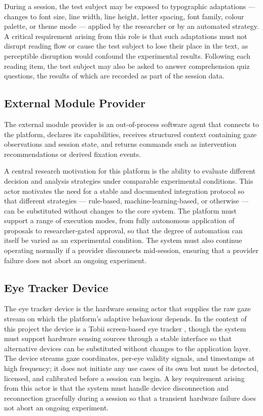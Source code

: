 During a session, the test subject may be exposed to typographic adaptations --- changes to font size, line width, line height, letter spacing, font family, colour palette, or theme mode --- applied by the researcher or by an automated strategy.
A critical requirement arising from this role is that such adaptations must not disrupt reading flow or cause the test subject to lose their place in the text, as perceptible disruption would confound the experimental results.
Following each reading item, the test subject may also be asked to answer comprehension quiz questions, the results of which are recorded as part of the session data.

\subsection{External Module Provider}
\label{sec:stakeholder-provider}

The external module provider is an out-of-process software agent that connects to the platform, declares its capabilities, receives structured context containing gaze observations and session state, and returns commands such as intervention recommendations or derived fixation events.

A central research motivation for this platform is the ability to evaluate different decision and analysis strategies under comparable experimental conditions.
This actor motivates the need for a stable and documented integration protocol so that different strategies --- rule-based, machine-learning-based, or otherwise --- can be substituted without changes to the core system.
The platform must support a range of execution modes, from fully autonomous application of proposals to researcher-gated approval, so that the degree of automation can itself be varied as an experimental condition.
The system must also continue operating normally if a provider disconnects mid-session, ensuring that a provider failure does not abort an ongoing experiment.

\subsection{Eye Tracker Device}
\label{sec:stakeholder-eyetracker}

The eye tracker device is the hardware sensing actor that supplies the raw gaze stream on which the platform's adaptive behaviour depends.
In the context of this project the device is a Tobii screen-based eye tracker \cite{ref3}, though the system must support hardware sensing sources through a stable interface so that alternative devices can be substituted without changes to the application layer.
The device streams gaze coordinates, per-eye validity signals, and timestamps at high frequency; it does not initiate any use cases of its own but must be detected, licensed, and calibrated before a session can begin.
A key requirement arising from this actor is that the system must handle device disconnection and reconnection gracefully during a session so that a transient hardware failure does not abort an ongoing experiment.

